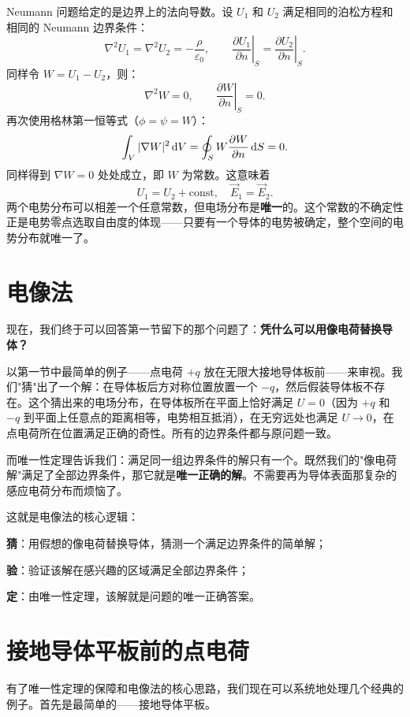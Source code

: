 Neumann 问题给定的是边界上的法向导数。设 $U_1$ 和 $U_2$ 满足相同的泊松方程和相同的 Neumann 边界条件：
\[\nabla^2 U_1 = \nabla^2 U_2 = -\frac{\rho}{\varepsilon_0}, \qquad \left.\frac{\partial U_1}{\partial n}\right|_S = \left.\frac{\partial U_2}{\partial n}\right|_S.\]
同样令 $W = U_1 - U_2$，则：
\[\nabla^2 W = 0, \qquad \left.\frac{\partial W}{\partial n}\right|_S = 0.\]
再次使用格林第一恒等式（$\phi = \psi = W$）：
\[\int_V |\nabla W|^2 \dif V = \oint_S W \frac{\partial W}{\partial n} \dif S = 0.\]
同样得到 $\nabla W = 0$ 处处成立，即 $W$ 为常数。这意味着
\[U_1 = U_2 + \text{const}, \quad \vec{E}_1 = \vec{E}_2.\]
两个电势分布可以相差一个任意常数，但电场分布是\textbf{唯一}的。这个常数的不确定性正是电势零点选取自由度的体现——只要有一个导体的电势被确定，整个空间的电势分布就唯一了。


\section{电像法}

现在，我们终于可以回答第一节留下的那个问题了：\textbf{凭什么可以用像电荷替换导体？}

以第一节中最简单的例子——点电荷 $+q$ 放在无限大接地导体板前——来审视。我们"猜"出了一个解：在导体板后方对称位置放置一个 $-q$，然后假装导体板不存在。这个猜出来的电场分布，在导体板所在平面上恰好满足 $U=0$（因为 $+q$ 和 $-q$ 到平面上任意点的距离相等，电势相互抵消），在无穷远处也满足 $U \to 0$，在点电荷所在位置满足正确的奇性。所有的边界条件都与原问题一致。

而唯一性定理告诉我们：满足同一组边界条件的解只有一个。既然我们的"像电荷解"满足了全部边界条件，那它就是\textbf{唯一正确的解}。不需要再为导体表面那复杂的感应电荷分布而烦恼了。

这就是电像法的核心逻辑：
\begin{Itemize}
    \item \textbf{猜}：用假想的像电荷替换导体，猜测一个满足边界条件的简单解；
    \item \textbf{验}：验证该解在感兴趣的区域满足全部边界条件；
    \item \textbf{定}：由唯一性定理，该解就是问题的唯一正确答案。
\end{Itemize}


\section{接地导体平板前的点电荷}

有了唯一性定理的保障和电像法的核心思路，我们现在可以系统地处理几个经典的例子。首先是最简单的——接地导体平板。

